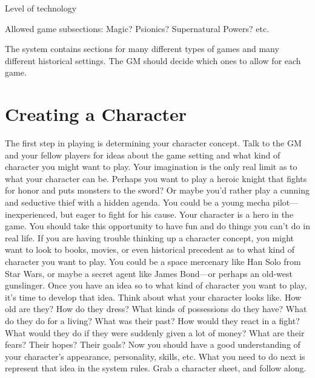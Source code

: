 \documentclass[twoside]{book}
\begin{document}
              
                Level of technology   
              
              
                  Allowed game subsections: Magic? Psionics?
                 Supernatural Powers? etc. 
              
           The \APATHY{}  system contains sections for many
            different types of games and many different historical
            settings. The GM should decide which ones to allow for each
            game.
          
\section{Creating a Character}
     The first step in playing \APATHY{}  is determining
            your character concept. Talk to the GM and your fellow
            players for ideas about the game setting and what kind of
            character you might want to play. Your imagination is the
            only real limit as to what your character can be. Perhaps you
            want to play a heroic knight that fights for honor and puts
            monsters to the sword? Or maybe you’d rather play a
            cunning and seductive thief with a hidden agenda. You could
            be a young mecha pilot—inexperienced, but eager to
            fight for his cause. Your character is a hero in the game.
            You should take this opportunity to have fun and do things
            you can’t do in real life.
           If you are having trouble thinking up a character
             concept, you might want to look to books, movies, or even
             historical precedent as to what kind of character you want
             to play. You could be a space mercenary like Han Solo from
             Star Wars, or maybe a secret agent like James Bond—or
             perhaps an old-west gunslinger.  Once you have an idea so to what kind of character you
             want to play, it’s time to develop that idea. Think
             about what your character looks like. How old are they? How
             do they dress? What kinds of possessions do they have? What
             do they do for a living? What was their past? How would they
             react in a fight? What would they do if they were suddenly
             given a lot of money? What are their fears? Their hopes?
             Their goals?  Now you should have a good understanding of your
            character’s appearance, personality, skills, etc. What
            you need to do next is represent that idea in the \APATHY{} 
            system rules. Grab a character sheet, and follow along.
          
\end{document}
